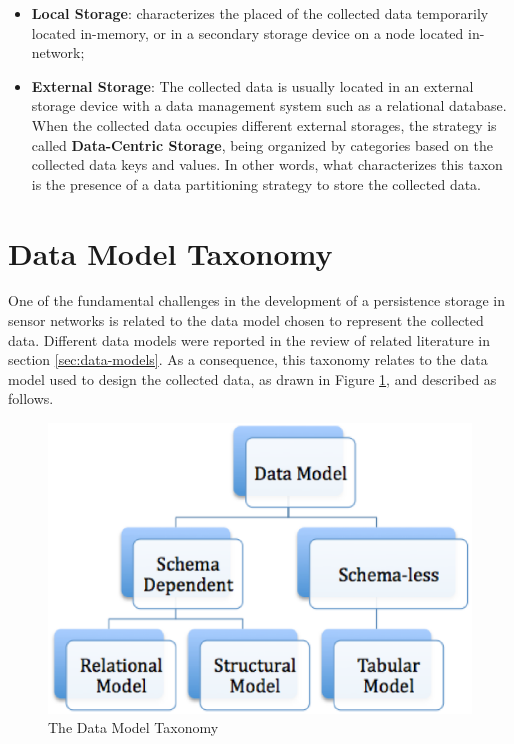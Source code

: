 \begin{itemize}
  \item \textbf{Local Storage}: characterizes the placed of the collected data
  temporarily located in-memory, or in a secondary storage device on a node
  located in-network;
  \item \textbf{External Storage}: The collected data is usually located in an
  external storage device with a data management system such as a relational
  database. When the collected data occupies different external storages, the
  strategy is called \textbf{Data-Centric Storage}, being organized by
  categories based on the collected data keys and values. In other words, what
  characterizes this taxon is the presence of a data partitioning strategy to
  store the collected data.
\end{itemize}

\section{Data Model Taxonomy}

One of the fundamental challenges in the development of a persistence storage
in sensor networks is related to the data model chosen to represent the
collected data. Different data models were reported in the review of related
literature in section \ref{sec:data-models}. As a consequence, this taxonomy
relates to the data model used to design the collected data, as drawn in Figure
\ref{fig:taxonomy-data-model}, and described as follows.

\begin{figure}[h]
  \centering
  \includegraphics[scale=0.5]{../diagrams/taxonomy-data-model}
  \caption{The Data Model Taxonomy}
  \label{fig:taxonomy-data-model}
\end{figure}

